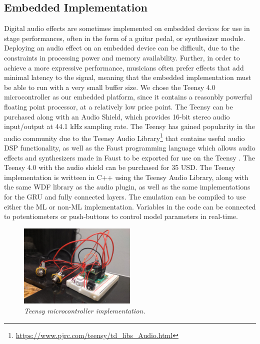 \documentclass[twoside,a4paper]{article}
\begin{document}
\subsection{Embedded Implementation}
Digital audio effects are sometimes implemented on embedded devices
for use in stage performances, often in the form of a guitar pedal,
or synthesizer module. Deploying an audio effect on an embedded device
can be difficult, due to the constraints in processing power and memory
availability. Further, in order to achieve a more expressive performance,
musicians often prefer effects that add minimal latency to the signal,
meaning that the embedded implementation must be able to run with a
very small buffer size.
\newline\newline
We chose the Teensy 4.0 microcontroller as our embedded platform, since
it contains a reasonbly powerful floating point processor, at a relatively
low price point. The Teensy can be purchased along with an Audio Shield,
which provides 16-bit stereo audio input/output at 44.1 kHz sampling rate.
The Teensy has gained popularity in the audio community due to
the Teensy Audio Library\footnote{\url{https://www.pjrc.com/teensy/td_libs_Audio.html}}
that contains useful audio DSP functionality, as well as the Faust
programming language which allows audio effects and synthesizers made in
Faust to be exported for use on the Teensy \cite{Michon2019RealTA}.
The Teensy 4.0 with the audio shield can be purchased for 35 USD.
\newline\newline
The Teensy implementation is writteen in C++ using the Teensy Audio Library,
along with the same WDF library as the audio plugin, as well as the same
implementations for the GRU and fully connected layers. The emulation
can be compiled to use either the ML or non-ML implementation. Variables
in the code can be connected to potentiometers or push-buttons to
control model parameters in real-time.
%
\begin{figure}
    \centering
    \includegraphics[width=0.5\textwidth]{Teensy.jpg}
    \caption{\label{fig:Teensy} {\it Teensy microcontroller implementation.}}
\end{figure}
\end{document}
